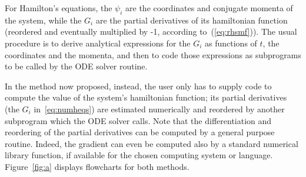 \documentclass{iopart}
\begin{document}
For Hamilton's equations, the $\psi_i$ are the coordinates and conjugate momenta
of the system, while the $G_i$ are the partial derivatives of its hamiltonian
function (reordered and eventually multiplied by -1, according
to~(\ref{eq:rhsmf})). The usual procedure is to derive analytical expressions
for the $G_i$ as functions of $t$, the coordinates and the momenta, and then to
code those expressions as subprograms to be called by the ODE solver routine.

In the method now proposed, instead, the user only has to supply code to
compute the value of the system's hamiltonian function; its partial derivatives
(the $G_i$ in~\eqref{eq:numheqs}) are estimated numerically and reordered by
another subprogram which the ODE solver calls. Note that the differentiation and
reordering of the partial derivatives can be computed by a general purpose
routine. Indeed, the gradient can even be computed also by a standard numerical
library function, if available for the chosen computing system or language.
Figure~\ref{fig:a} displays flowcharts for both methods.
\end{document}
